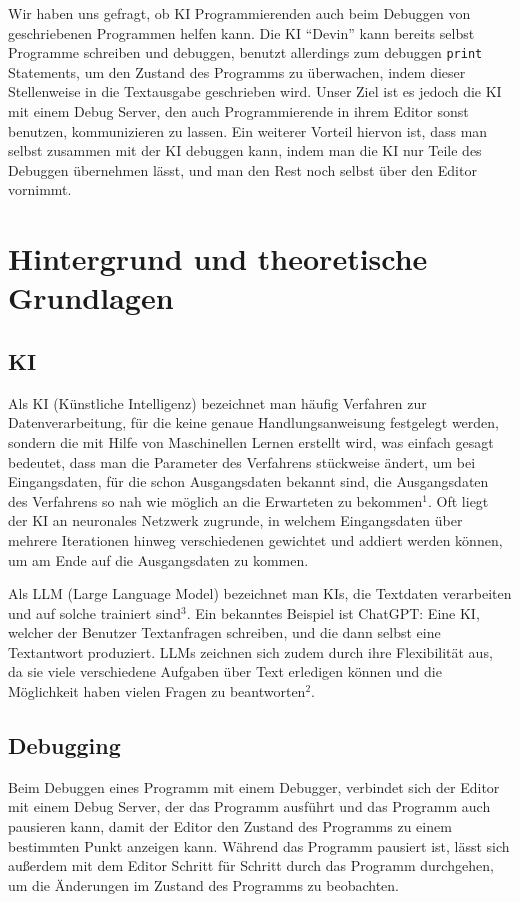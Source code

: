 \documentclass[a4paper,12pt,ngerman]{scrartcl}
\begin{document}
Wir haben uns gefragt, ob KI Programmierenden auch beim Debuggen von geschriebenen Programmen helfen kann. Die KI ``Devin'' kann bereits selbst Programme schreiben und debuggen, benutzt allerdings zum debuggen \texttt{print} Statements, um den Zustand des Programms zu überwachen, indem dieser Stellenweise in die Textausgabe geschrieben wird. Unser Ziel ist es jedoch die KI mit einem Debug Server, den auch Programmierende in ihrem Editor sonst benutzen, kommunizieren zu lassen. Ein weiterer Vorteil hiervon ist, dass man selbst zusammen mit der KI debuggen kann, indem man die KI nur Teile des Debuggen übernehmen lässt, und man den Rest noch selbst über den Editor vornimmt.

\section{Hintergrund und theoretische Grundlagen}

\subsection{KI}

Als KI (Künstliche Intelligenz) bezeichnet man häufig Verfahren zur Datenverarbeitung, für die keine genaue Handlungsanweisung festgelegt werden, sondern die mit Hilfe von Maschinellen Lernen erstellt wird, was einfach gesagt bedeutet, dass man die Parameter des Verfahrens stückweise ändert, um bei Eingangsdaten, für die schon Ausgangsdaten bekannt sind, die Ausgangsdaten des Verfahrens so nah wie möglich an die Erwarteten zu bekommen$^1$. Oft liegt der KI an neuronales Netzwerk zugrunde, in welchem Eingangsdaten über mehrere Iterationen hinweg verschiedenen gewichtet und addiert werden können, um am Ende auf die Ausgangsdaten zu kommen.

Als LLM (Large Language Model) bezeichnet man KIs, die Textdaten verarbeiten und auf solche trainiert sind$^3$. Ein bekanntes Beispiel ist ChatGPT: Eine KI, welcher der Benutzer Textanfragen schreiben, und die dann selbst eine Textantwort produziert. LLMs zeichnen sich zudem durch ihre Flexibilität aus, da sie viele verschiedene Aufgaben über Text erledigen können und die Möglichkeit haben vielen Fragen zu beantworten$^2$.

\subsection{Debugging}

Beim Debuggen eines Programm mit einem Debugger, verbindet sich der Editor mit einem Debug Server, der das Programm ausführt und das Programm auch pausieren kann, damit der Editor den Zustand des Programms zu einem bestimmten Punkt anzeigen kann. Während das Programm pausiert ist, lässt sich außerdem mit dem Editor Schritt für Schritt durch das Programm durchgehen, um die Änderungen im Zustand des Programms zu beobachten.
\end{document}
